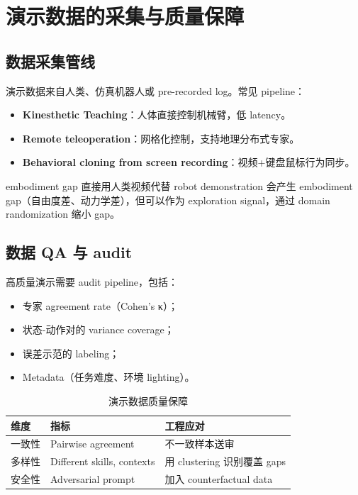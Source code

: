 \section{演示数据的采集与质量保障}

\subsection{数据采集管线}

演示数据来自人类、仿真机器人或 pre-recorded log。常见 pipeline：
\begin{itemize}
    \item \textbf{Kinesthetic Teaching}：人体直接控制机械臂，低 latency。
    \item \textbf{Remote teleoperation}：网格化控制，支持地理分布式专家。
    \item \textbf{Behavioral cloning from screen recording}：视频+键盘鼠标行为同步。
\end{itemize}

\begin{knowledgebox}{embodiment gap}
直接用人类视频代替 robot demonstration 会产生 embodiment gap（自由度差、动力学差），但可以作为 exploration signal，通过 domain randomization 缩小 gap。
\end{knowledgebox}

\subsection{数据 QA 与 audit}

高质量演示需要 audit pipeline，包括：
\begin{itemize}
    \item 专家 agreement rate（Cohen's κ）；
    \item 状态-动作对的 variance coverage；
    \item 误差示范的 labeling；
    \item Metadata（任务难度、环境 lighting）。
\end{itemize}

\begin{table}[H]
\centering
\begin{tabular}{p{} p{} p{}}
\toprule
维度 & 指标 & 工程应对 \\
\midrule
一致性 & Pairwise agreement & 不一致样本送审 \\
多样性 & Different skills, contexts & 用 clustering 识别覆盖 gaps \\
安全性 & Adversarial prompt & 加入 counterfactual data \\
\bottomrule
\end{tabular}
\caption{演示数据质量保障}
\end{table}

